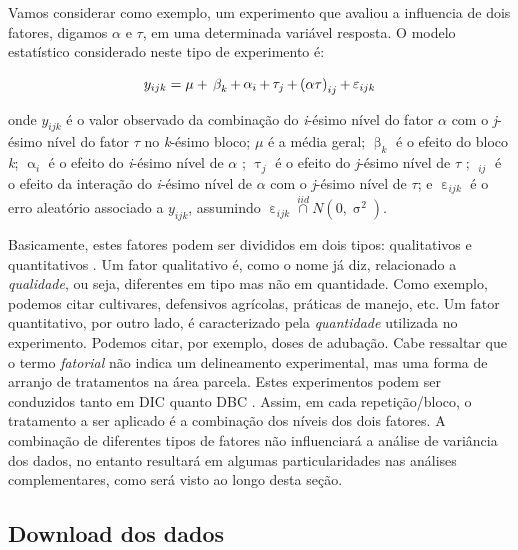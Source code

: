 \documentclass[
]{book}
\begin{document}
Vamos considerar como exemplo, um experimento que avaliou a influencia de dois fatores, digamos \(\alpha\) e \(\tau\), em uma determinada variável resposta. O modelo estatístico considerado neste tipo de experimento é:

\[
{y_{ijk}} = {\rm{ }}\mu {\rm{ }} + {\rm{ }}\mathop \beta \nolimits_{k}  + \mathop \alpha \nolimits_i  + \mathop \tau \nolimits_j  + \mathop {(\alpha \tau )}\nolimits_{ij}  + {\rm{ }}\mathop \varepsilon \nolimits_{ijk}
\]

onde \({y_{ijk}}\) é o valor observado da combinação do \emph{i}-ésimo nível do fator \(\alpha\) com o \emph{j}-ésimo nível do fator \(\tau\) no \emph{k}-ésimo bloco; \(\mu\) é a média geral; \(\mathop \beta \nolimits_{k}\) é o efeito do bloco \emph{k}; \(\mathop \alpha \nolimits_i\) é o efeito do \emph{i}-ésimo nível de \(\alpha\) ; \(\mathop \tau \nolimits_j\) é o efeito do \emph{j}-ésimo nível de \(\tau\) ; \(\mathop {(\alpha \tau )}\nolimits_{ij}\) é o efeito da interação do \emph{i}-ésimo nível de \(\alpha\) com o \emph{j}-ésimo nível de \(\tau\); e \(\mathop \varepsilon \nolimits_{ijk}\) é o erro aleatório associado a \({y_{ijk}}\), assumindo \(\mathop \varepsilon \nolimits_{ijk} \mathop \cap \limits^{iid} N(0,\mathop \sigma \nolimits^2 )\).

Basicamente, estes fatores podem ser divididos em dois tipos: qualitativos  e quantitativos . Um fator qualitativo é, como o nome já diz, relacionado a \emph{qualidade}, ou seja, diferentes em tipo mas não em quantidade. Como exemplo, podemos citar cultivares, defensivos agrícolas, práticas de manejo, etc. Um fator quantitativo, por outro lado, é caracterizado pela \emph{quantidade} utilizada no experimento. Podemos citar, por exemplo, doses de adubação. Cabe ressaltar que o termo \emph{fatorial} não indica um delineamento experimental, mas uma forma de arranjo de tratamentos na área parcela. Estes experimentos podem ser conduzidos tanto em DIC  quanto DBC . Assim, em cada repetição/bloco, o tratamento a ser aplicado é a combinação dos níveis dos dois fatores. A combinação de diferentes tipos de fatores não influenciará a análise de variância dos dados, no entanto resultará em algumas particularidades nas análises complementares, como será visto ao longo desta seção.

\hypertarget{download-dos-dados}{%
\subsection{Download dos dados}\label{download-dos-dados}}
\end{document}
